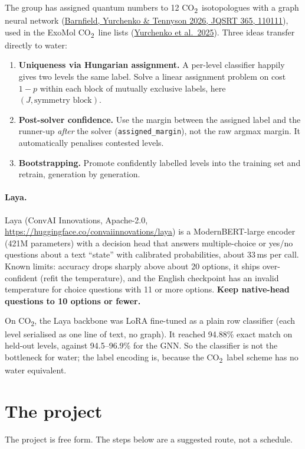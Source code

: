 \documentclass[11pt,a4paper]{article}
\newcommand{\cotwo}{CO\textsubscript{2}}
\newcommand{\doi}[2]{\href{https://doi.org/#1}{#2}}
\begin{document}
The group has assigned quantum numbers to 12 \cotwo\ isotopologues with a graph neural network (\doi{10.1016/j.jqsrt.2026.110111}{Barnfield, Yurchenko \& Tennyson 2026, JQSRT 365, 110111}), used in the ExoMol \cotwo\ line lists (\doi{10.1093/mnras/staf2135}{Yurchenko et al.\ 2025}). Three ideas transfer directly to water:
\begin{enumerate}
  \item \textbf{Uniqueness via Hungarian assignment.} A per-level classifier happily gives two levels the same label. Solve a linear assignment problem on cost $1-p$ within each block of mutually exclusive labels, here $(J, \text{symmetry block})$.
  \item \textbf{Post-solver confidence.} Use the margin between the assigned label and the runner-up \emph{after} the solver (\texttt{assigned\_margin}), not the raw argmax margin. It automatically penalises contested levels.
  \item \textbf{Bootstrapping.} Promote confidently labelled levels into the training set and retrain, generation by generation.
\end{enumerate}

\paragraph{Laya.} Laya (ConvAI Innovations, Apache-2.0, \url{https://huggingface.co/convaiinnovations/laya}) is a ModernBERT-large encoder (421M parameters) with a decision head that answers multiple-choice or yes/no questions about a text ``state'' with calibrated probabilities, about 33\,ms per call. Known limits: accuracy drops sharply above about 20 options, it ships over-confident (refit the temperature), and the English checkpoint has an invalid temperature for choice questions with 11 or more options. \textbf{Keep native-head questions to 10 options or fewer.}

On \cotwo, the Laya backbone was LoRA fine-tuned as a plain row classifier (each level serialised as one line of text, no graph). It reached 94.88\% exact match on held-out levels, against 94.5--96.9\% for the GNN. So the classifier is not the bottleneck for water; the label encoding is, because the \cotwo\ label scheme has no water equivalent.

\section{The project}

The project is free form. The steps below are a suggested route, not a schedule.
\end{document}
